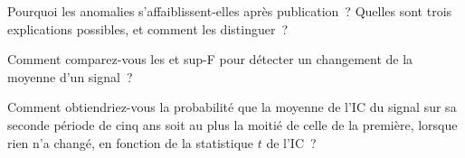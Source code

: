 \begin{interviewq}\label{iq:rs:half-life-decay-and-stability:4}
Pourquoi les anomalies s'affaiblissent-elles après publication~? Quelles sont trois explications possibles, et comment les distinguer~?
\end{interviewq}

\begin{interviewq}\label{iq:rs:half-life-decay-and-stability:5}
Comment comparez-vous les  et sup-F pour détecter un changement de la moyenne d'un signal~?
\end{interviewq}

\begin{interviewq}\label{iq:rs:half-life-decay-and-stability:6}
Comment obtiendriez-vous la probabilité que la moyenne de l'IC du signal sur sa seconde période de cinq ans soit au plus la moitié de celle de la première, lorsque rien n'a changé, en fonction de la
statistique $t$ de l'IC~?
\end{interviewq}
